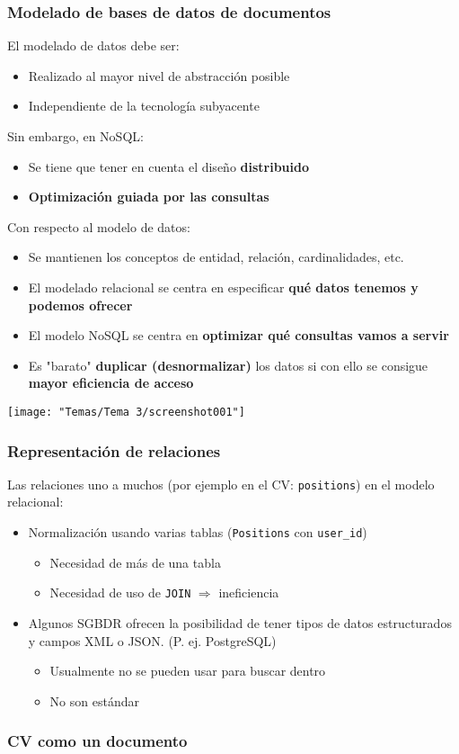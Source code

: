 \subsubsection{Modelado de bases de datos de documentos}
El modelado de datos debe ser:
\begin{itemize}
\item Realizado al mayor nivel de abstracción posible
\item Independiente de la tecnología subyacente
\end{itemize}
Sin embargo, en NoSQL:
\begin{itemize}
\item  Se tiene que tener en cuenta el diseño \textbf{distribuido}
\item \textbf{Optimización guiada por las consultas}
\end{itemize}
Con respecto al modelo de datos:
\begin{itemize}
\item Se mantienen los conceptos de entidad, relación, cardinalidades, etc.
\item El modelado relacional se centra en especificar \textbf{qué datos tenemos y podemos ofrecer}
\item El modelo NoSQL se centra en \textbf{optimizar qué consultas vamos a servir}
\item Es "barato" \textbf{duplicar (desnormalizar)} los datos si con ello se consigue \textbf{mayor eficiencia de acceso}
\end{itemize}
\begin{center}
	\texttt{[image: "Temas/Tema 3/screenshot001"]}
\end{center}
\subsubsection{Representación de relaciones}
Las relaciones uno a muchos (por ejemplo en el CV: \texttt{positions}) en el modelo relacional:
\begin{itemize}
	\item Normalización usando varias tablas (\texttt{Positions} con \texttt{user_id})
\begin{itemize}
	\item Necesidad de más de una tabla
\item Necesidad de uso de \texttt{JOIN} $\Rightarrow$ ineficiencia
\end{itemize}
\item Algunos SGBDR ofrecen la posibilidad de tener tipos de datos estructurados y campos XML o JSON. (P. ej. PostgreSQL)
\begin{itemize}
	\item Usualmente no se pueden usar para buscar dentro
\item No son estándar
\end{itemize}
\end{itemize}
\subsubsection{CV como un documento}
\begin{lstlisting}[language=C++]

\end{lstlisting}